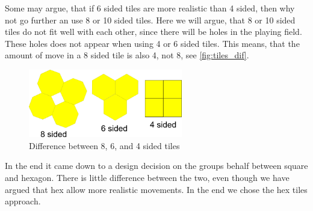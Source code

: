 Some may argue, that if 6 sided tiles are more realistic than 4 sided, then why not go further an use 8 or 10 sided tiles. Here we will argue, that 8 or 10 sided tiles do not fit well with each other, since there will be holes in the playing field. These holes does not appear when using 4 or 6 sided tiles. This means, that the amount of move in a 8 sided tile is also 4, not 8, see \autoref{fig:tiles_dif}.

\begin{figure}[h]
  \centering
    \includegraphics[width=0.6\textwidth]{img/8-6-4-sided-tiles.png}
  \caption{Difference between 8, 6, and 4 sided tiles}
  \label{fig:tiles_dif}
\end{figure}

In the end it came down to a design decision on the groups behalf between square and hexagon. There is little difference between the two, even though we have argued that hex allow more realistic movements. In the end we chose the hex tiles approach.



